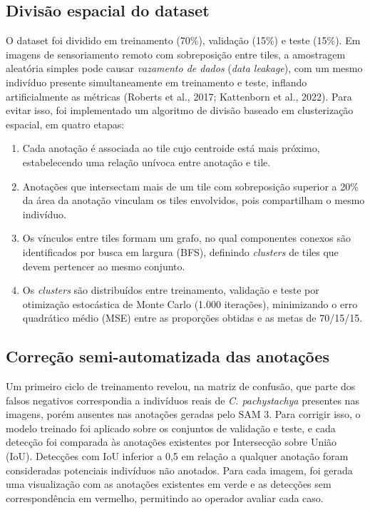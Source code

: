 \documentclass[12pt, a4paper]{article}
\begin{document}
\subsection{Divisão espacial do dataset}

O dataset foi dividido em treinamento (70\%), validação (15\%) e teste (15\%). Em
imagens de sensoriamento remoto com sobreposição entre tiles, a amostragem
aleatória simples pode causar \textit{vazamento de dados} (\textit{data leakage}),
com um mesmo indivíduo presente simultaneamente em treinamento e teste, inflando
artificialmente as métricas (Roberts et al., 2017; Kattenborn et al., 2022). Para
evitar isso, foi implementado um algoritmo de divisão baseado em clusterização
espacial, em quatro etapas:

\begin{enumerate}
    \item Cada anotação é associada ao tile cujo centroide está mais próximo,
    estabelecendo uma relação unívoca entre anotação e tile.
    \item Anotações que intersectam mais de um tile com sobreposição superior a
    20\% da área da anotação vinculam os tiles envolvidos, pois compartilham o
    mesmo indivíduo.
    \item Os vínculos entre tiles formam um grafo, no qual componentes conexos são
    identificados por busca em largura (BFS), definindo \textit{clusters} de tiles
    que devem pertencer ao mesmo conjunto.
    \item Os \textit{clusters} são distribuídos entre treinamento, validação e
    teste por otimização estocástica de Monte Carlo (1.000 iterações), minimizando
    o erro quadrático médio (MSE) entre as proporções obtidas e as metas de
    70/15/15.
\end{enumerate}

\subsection{Correção semi-automatizada das anotações}

Um primeiro ciclo de treinamento revelou, na matriz de confusão, que parte dos
falsos negativos correspondia a indivíduos reais de \textit{C. pachystachya}
presentes nas imagens, porém ausentes nas anotações geradas pelo SAM 3. Para
corrigir isso, o modelo treinado foi aplicado sobre os conjuntos de validação e
teste, e cada detecção foi comparada às anotações existentes por Intersecção sobre
União (IoU). Detecções com IoU inferior a 0,5 em relação a qualquer anotação foram
consideradas potenciais indivíduos não anotados. Para cada imagem, foi gerada uma
visualização com as anotações existentes em verde e as detecções sem correspondência
em vermelho, permitindo ao operador avaliar cada caso.
\end{document}

